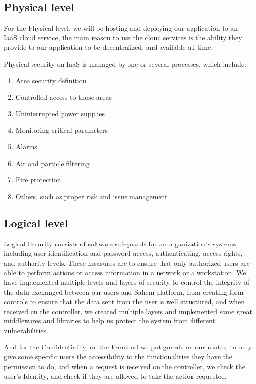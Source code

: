 \subsection{Physical level}
For the Physical level, we will be hosting and deploying our application to an IaaS cloud service, the main reason to use the cloud services is the ability they provide to our application to be decentralized, and available all time.

Physical security on IaaS is managed by one or several processes, which include:
\begin{enumerate}
      \item 
      Area security definition
      \item 
      Controlled access to those areas
      \item 
      Uninterrupted power supplies
      \item 
      Monitoring critical parameters
      \item 
      Alarms
      \item 
      Air and particle filtering
      \item 
      Fire protection
      \item 
      Others, such as proper risk and issue management
\end{enumerate}
\subsection{Logical level}
Logical Security consists of software safeguards for an organization's systems, including user identification and password access, authenticating, access rights, and authority levels. These measures are to ensure that only authorized users are able to perform actions or access information in a network or a workstation.
We have implemented multiple levels and layers of security to control the integrity of the data exchanged between our users and Sahem platform, from creating form controls to ensure that the data sent from the user is well structured, and when received on the controller, we created multiple layers and implemented some great middlewares and libraries to help us protect the system from different vulnerabilities.

And for the Confidentiality, on the Frontend we put guards on our routes, to only give some specific users the accessibility to the functionalities they have the permission to do, and when a request is received on the controller, we check the user's Identity, and check if they are allowed to take the action requested.
